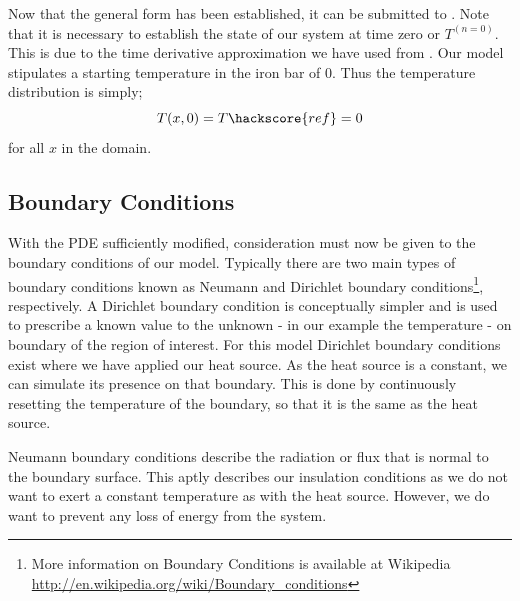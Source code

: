 Now that the general form has been established, it can be submitted to \esc. Note that it is necessary to establish the state of our system at time zero or $T^{(n=0)}$. This is due to the time derivative approximation we have used from . Our model stipulates a starting temperature in the iron bar of 0\textcelsius. Thus the temperature distribution is simply;
\begin{equation}
T(x,0) = T\hackscore{ref} = 0
\end{equation}
for all $x$ in the domain. 

\subsection{Boundary Conditions}
With the PDE sufficiently modified, consideration must now be given to the boundary conditions of our model. Typically there are two main types of boundary conditions known as Neumann and Dirichlet boundary conditions\footnote{More information on Boundary Conditions is available at Wikipedia \url{http://en.wikipedia.org/wiki/Boundary_conditions}}, respectively. 
A Dirichlet boundary condition is conceptually simpler and is used to prescribe a known value to the unknown - in our example the temperature - on boundary of the region of interest. 
For this model Dirichlet boundary conditions exist where we have applied our heat source. As the heat source is a constant, we can simulate its presence on that boundary. This is done by continuously resetting the temperature of the boundary, so that it is the same as the heat source.  

Neumann boundary conditions describe the radiation or flux that is normal to the boundary surface. This aptly describes our insulation conditions as we do not want to exert a constant temperature as with the heat source. However, we do want to prevent any loss of energy from the system. 

